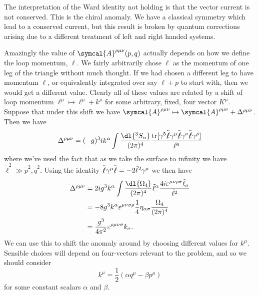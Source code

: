 \documentclass[fleqn]{NotesClass}
\newcommand{\amplitude}{\symcal{A}}
\newcommand{\minkowskiMetric}{\eta}
\DeclareMathOperator{\tr}{tr}
\begin{document}
    The interpretation of the Ward identity not holding is that the vector current is not conserved.
    This is the chiral anomaly.
    We have a classical symmetry which lead to a conserved current, but this result is broken by quantum corrections arising due to a different treatment of left and right handed systems.
    
    Amazingly the value of \(\amplitude^{\rho\mu\nu}(p, q)\) actually depends on how we define the loop momentum, \(\ell\).
    We fairly arbitrarily chose \(\ell\) as the momentum of one leg of the triangle without much thought.
    If we had chosen a different leg to have momentum \(\ell\), or equivalently integrated over say \(\ell + p\) to start with, then we would get a different value.
    Clearly all of these values are related by a shift of loop momentum \(\ell^\mu \mapsto \ell^\mu + k^\mu\) for some arbitrary, fixed, four vector \(K^\mu\).
    Suppose that under this shift we have \(\amplitude^{\rho\mu\nu} \mapsto \amplitude^{\rho\mu\nu} + \Delta^{\rho\mu\nu}\).
    Then we have
    \begin{equation}
        \Delta^{\rho\mu\nu} = (-g)^3 ik^\alpha \int \frac{\dl{^3S_\alpha}}{(2\pi)^4} \frac{\tr[\gamma^5\tilde{\slashed{\ell}} \gamma^\mu \tilde{\slashed{\ell}} \gamma^\nu \tilde{\slashed{\ell}} \gamma^\rho]}{\tilde{\ell}^6}
    \end{equation}
    where we've used the fact that as we take the surface to infinity we have \(\tilde{\ell}^2 \gg \tilde{p}^2, \tilde{q}^2\).
    Using the identity \(\tilde{\slashed{\ell}} \gamma^\mu \tilde{\slashed{\ell}} = -2\tilde{\ell}^2 \gamma^\mu\) we then have
    \begin{align}
        \Delta^{\rho\mu\nu} &= 2ig^3k^\alpha \int \frac{\dl{\Omega_4}}{(2\pi)^4} \tilde{\ell}^\alpha \frac{4i\varepsilon^{\mu\nu\rho\sigma}\tilde{\ell}_\sigma}{\tilde{\ell}^2}\\
        &= -8g^3k^\alpha \varepsilon^{\mu\nu\sigma\rho} \frac{1}{4}\minkowskiMetric_{\alpha\sigma} \frac{\Omega_4}{(2\pi)^4}\\
        &= \frac{g^3}{4\pi^2} \varepsilon^{\rho\mu\nu\sigma}k_\sigma.
    \end{align}
    We can use this to shift the anomaly around by choosing different values for \(k^\mu\).
    Sensible choices will depend on four-vectors relevant to the problem, and so we should consider
    \begin{equation}
        k^\mu = \frac{1}{2}(\alpha q^\mu - \beta p^\mu)
    \end{equation}
    for some constant scalars \(\alpha\) and \(\beta\).
    
\end{document}
